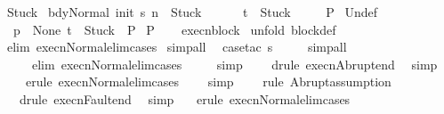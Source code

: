 \begin{isabellebody}
\ Stuck{\isacharcolon}\isanewline
\ {\isachardoublequoteopen}{\isasymlbrakk}{\isasymGamma}{\isasymturnstile}{\isasymlangle}bdy{\isacharcomma}Normal\ {\isacharparenleft}init\ s{\isacharparenright}{\isasymrangle}\ {\isacharequal}n{\isasymRightarrow}\ \ Stuck{\isacharsemicolon}\ \isanewline
\ \ \ \ \ t\ {\isacharequal}\ Stuck{\isasymrbrakk}\isanewline
\ \ \ \ {\isasymLongrightarrow}\ P{\isachardoublequoteclose}\isanewline
{}\ Undef{\isacharcolon}\isanewline
\ {\isachardoublequoteopen}{\isasymlbrakk}{\isasymGamma}\ p\ {\isacharequal}\ None{\isacharsemicolon}\ t\ {\isacharequal}\ Stuck{\isasymrbrakk}\ {\isasymLongrightarrow}\ P{\isachardoublequoteclose}\isanewline
{}\ {\isachardoublequoteopen}P{\isachardoublequoteclose}\isanewline
%
\isadelimproof
\ \ %
\endisadelimproof
%
\isatagproof
{}\isamarkupfalse%
\ execn{\isacharunderscore}block\isanewline
{}\isamarkupfalse%
\ {\isacharparenleft}unfold\ block{\isacharunderscore}def{\isacharparenright}\isanewline
{}\isamarkupfalse%
\ {\isacharparenleft}elim\ execn{\isacharunderscore}Normal{\isacharunderscore}elim{\isacharunderscore}cases{\isacharparenright}\isanewline
{}\isamarkupfalse%
\ simp{\isacharunderscore}all\isanewline
{}\isamarkupfalse%
\ \ {\isacharparenleft}case{\isacharunderscore}tac\ s{\isacharprime}{\isacharparenright}\isanewline
{}\isamarkupfalse%
\ \ \ \ \ simp{\isacharunderscore}all\isanewline
{}\isamarkupfalse%
\ \ \ \ \ {\isacharparenleft}elim\ execn{\isacharunderscore}Normal{\isacharunderscore}elim{\isacharunderscore}cases{\isacharparenright}\isanewline
{}\isamarkupfalse%
\ \ \ \ \ simp\isanewline
{}\isamarkupfalse%
\ \ \ \ {\isacharparenleft}drule\ execn{\isacharunderscore}Abrupt{\isacharunderscore}end{\isacharparenright}\ \isamarkupfalse%
\ simp\ \isanewline
{}\isamarkupfalse%
\ \ \ \ {\isacharparenleft}erule\ execn{\isacharunderscore}Normal{\isacharunderscore}elim{\isacharunderscore}cases{\isacharparenright}\isanewline
{}\isamarkupfalse%
\ \ \ \ simp\isanewline
{}\isamarkupfalse%
\ \ \ \ {\isacharparenleft}rule\ Abrupt{\isacharcomma}assumption{\isacharplus}{\isacharparenright}\isanewline
{}\isamarkupfalse%
\ \ \ {\isacharparenleft}drule\ execn{\isacharunderscore}Fault{\isacharunderscore}end{\isacharparenright}\ \isamarkupfalse%
\ simp\isanewline
{}\isamarkupfalse%
\ \ \ {\isacharparenleft}erule\ execn{\isacharunderscore}Normal{\isacharunderscore}elim{\isacharunderscore}cases{\isacharparenright}\isanewline

\end{isabellebody}
